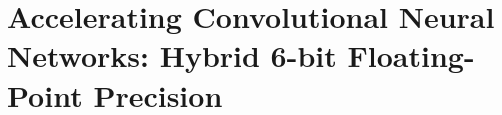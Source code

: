 \chapter{Accelerating Convolutional Neural Networks: Hybrid 6-bit Floating-Point Precision}\label{chap.cnn}
\minitoc









